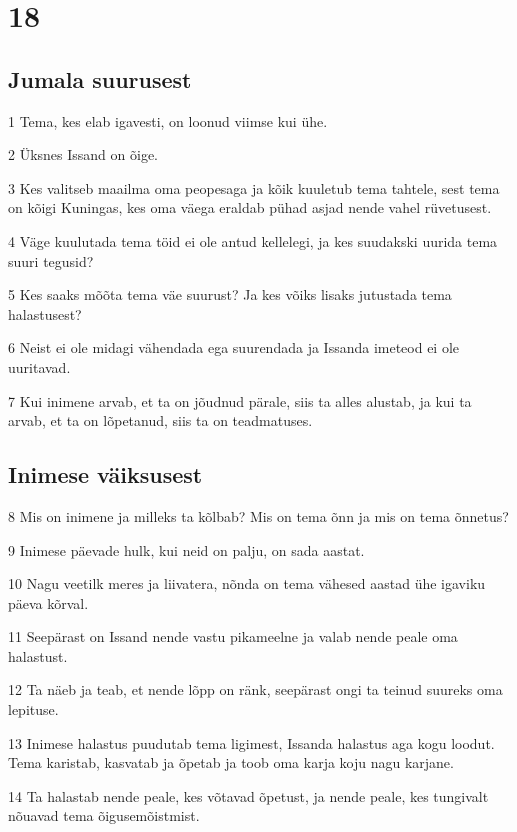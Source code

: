\chapter{18}

\section*{Jumala suurusest}

\par 1 Tema, kes elab igavesti, on loonud viimse kui ühe.
\par 2 Üksnes Issand on õige.
\par 3 Kes valitseb maailma oma peopesaga ja kõik kuuletub tema tahtele, sest tema on kõigi Kuningas, kes oma väega eraldab pühad asjad nende vahel rüvetusest.
\par 4 Väge kuulutada tema töid ei ole antud kellelegi, ja kes suudakski uurida tema suuri tegusid?
\par 5 Kes saaks mõõta tema väe suurust? Ja kes võiks lisaks jutustada tema halastusest?
\par 6 Neist ei ole midagi vähendada ega suurendada ja Issanda imeteod ei ole uuritavad.
\par 7 Kui inimene arvab, et ta on jõudnud pärale, siis ta alles alustab, ja kui ta arvab, et ta on lõpetanud, siis ta on teadmatuses.

\section*{Inimese väiksusest}

\par 8 Mis on inimene ja milleks ta kõlbab? Mis on tema õnn ja mis on tema õnnetus?
\par 9 Inimese päevade hulk, kui neid on palju, on sada aastat.
\par 10 Nagu veetilk meres ja liivatera, nõnda on tema vähesed aastad ühe igaviku päeva kõrval.
\par 11 Seepärast on Issand nende vastu pikameelne ja valab nende peale oma halastust.
\par 12 Ta näeb ja teab, et nende lõpp on ränk, seepärast ongi ta teinud suureks oma lepituse.
\par 13 Inimese halastus puudutab tema ligimest, Issanda halastus aga kogu loodut. Tema karistab, kasvatab ja õpetab ja toob oma karja koju nagu karjane.
\par 14 Ta halastab nende peale, kes võtavad õpetust, ja nende peale, kes tungivalt nõuavad tema õigusemõistmist.

